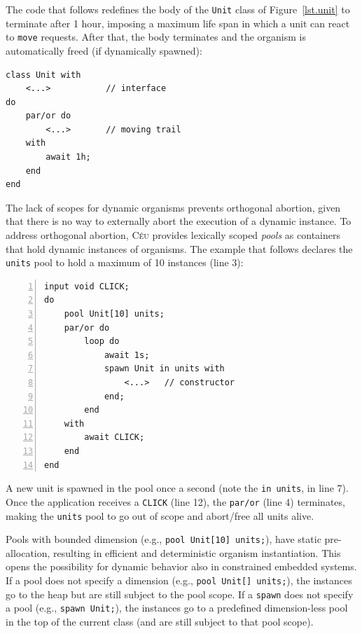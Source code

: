 \documentclass[preprint]{sigplanconf}
\newcommand{\CEU}{\textsc{C\'{e}u}\xspace}
\newcommand{\code}[1] {{\small{\texttt{#1}}}}
\newcommand{\1}{\;}
\newcommand{\2}{\;\;}
\newcommand{\3}{\;\;\;}
\newcommand{\5}{\;\;\;\;\;}
\begin{document}
The code that follows redefines the body of the \code{Unit} class of 
Figure~\ref{lst.unit} to terminate after 1 hour, imposing a maximum life span 
in which a unit can react to \code{move} requests.
After that, the body terminates and the organism is automatically freed (if 
dynamically spawned):

\begin{lstlisting}
class Unit with
    <...>           // interface
do
    par/or do
        <...>       // moving trail
    with
        await 1h;
    end
end
\end{lstlisting}

The lack of scopes for dynamic organisms prevents orthogonal abortion, given 
that there is no way to externally abort the execution of a dynamic instance.
%
To address orthogonal abortion, \CEU provides lexically scoped \emph{pools} as 
containers that hold dynamic instances of organisms.
%
The example that follows declares the \code{units} pool to hold a maximum of 10 
instances (line 3):


\begin{lstlisting}[numbers=left,xleftmargin=3em]
input void CLICK;
do
    pool Unit[10] units;
    par/or do
        loop do
            await 1s;
            spawn Unit in units with
                <...>   // constructor
            end;
        end
    with
        await CLICK;
    end
end
\end{lstlisting}

A new unit is spawned in the pool once a second (note the \code{in units}, in 
line 7).
Once the application receives a \code{CLICK} (line 12), the \code{par/or} (line 
4) terminates, making the \code{units} pool to go out of scope and abort/free 
all units alive.

Pools with bounded dimension (e.g., \code{pool Unit[10] units;}), have static 
pre-allocation, resulting in efficient and deterministic organism 
instantiation.
This opens the possibility for dynamic behavior also in constrained embedded 
systems.
%
If a pool does not specify a dimension (e.g., \code{pool Unit[] units;}), the 
instances go to the heap but are still subject to the pool scope.
%
If a \code{spawn} does not specify a pool (e.g., \code{spawn Unit;}), the 
instances go to a predefined dimension-less pool in the top of the current 
class (and are still subject to that pool scope).
\end{document}
